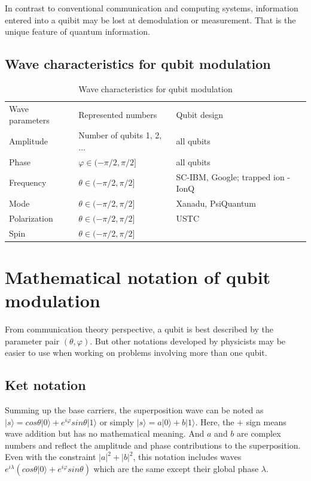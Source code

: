 \documentclass{book}
\newcommand\keta[2][]{#1\lvert {#2} #1\rangle}
\begin{document}
In contrast to conventional communication and computing systems, information entered into a quibit may be lost at demodulation or measurement. That is the unique feature of quantum information.

\subsection{Wave characteristics for qubit modulation}
\begin{table}[]
\caption{Wave characteristics for qubit modulation}
\label{modulation-characteristics}
\begin{tabular}{lll}
Wave parameters &Represented numbers &Qubit design   \\
Amplitude & Number of qubits 1, 2, ... & all qubits \\
Phase & $\varphi \in (-\pi /2, \pi /2] $& all qubits \\
Frequency & $\theta \in (-\pi /2, \pi /2]$ & SC-IBM, Google; trapped ion - IonQ \\
Mode & $\theta \in (-\pi /2, \pi /2]$ & Xanadu, PsiQuantum \\
Polarization & $\theta \in (-\pi /2, \pi /2]$ & USTC \\
Spin & $\theta \in (-\pi /2, \pi /2]$ & 
\end{tabular}
\end{table}

\section{Mathematical notation of qubit modulation}
From communication theory perspective, a qubit is best described by the parameter pair $(\theta, \varphi)$. But other notations developed by physicists may be easier to use when working on problems involving more than one qubit. 
\subsection{Ket notation}
Summing up the base carriers, the superposition wave can be noted as $\keta{s} = cos{\theta} \keta{0} + e^{i \varphi} sin{\theta} \keta{1}$ or simply $\keta{s} = a \keta{0} + b \keta{1}$. Here, the $+$ sign means wave addition but has no mathematical meaning. And $a$ and $b$ are complex numbers and reflect the amplitude and phase contributions to the superposition. Even with the constraint $|a|^2+ |b|^2$, this notation includes waves $e^{i\lambda} (cos{\theta} \keta{0} + e^{i \varphi} sin{\theta})$ which are the same except their global phase $\lambda$.
\end{document}
